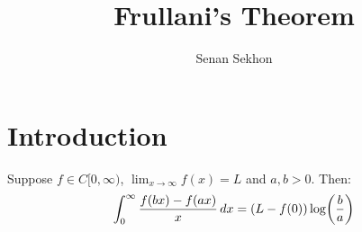 \documentclass[main.tex]{subfiles}
\title{Frullani's Theorem}
\author{Senan Sekhon}
\date{\DTMToday}
\begin{document}
\maketitle

\VersionTimestamp

\section{Introduction}

\begin{theorem}\label{frullanis_theorem}
    Suppose $f\in C[0,\infty)$, $\lim_{x\to\infty} f(x)=L$ and $a,b>0$. Then:
    \begin{equation*}
        \int_0^\infty \frac{f(bx)-f(ax)}{x}\,dx=\qty(L-f(0))\log(\frac{b}{a})
    \end{equation*}
\end{theorem}
\end{document}
